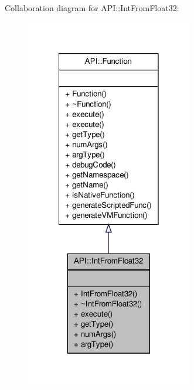 Collaboration diagram for A\-P\-I\-:\-:Int\-From\-Float32\-:
\nopagebreak
\begin{figure}[H]
\begin{center}
\leavevmode
\includegraphics[width=206pt]{class_a_p_i_1_1_int_from_float32__coll__graph}
\end{center}
\end{figure}
